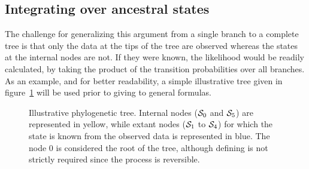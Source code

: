 \subsection{Integrating over ancestral states}
The challenge for generalizing this argument from a single branch to a complete tree is that only the data at the tips of the tree are observed whereas the states at the internal nodes are not.
If they were known, the likelihood would be readily calculated, by taking the product of the transition probabilities over all branches.
As an example, and for better readability, a simple illustrative tree given in figure~\ref{fig:tree} will be used prior to giving to general formulas.
\begin{figure}[H]
    \centering
    \caption[Illustrative phylogenetic tree]{
    Illustrative phylogenetic tree.
    Internal nodes ($\mathcal{S}_0$ and $\mathcal{S}_5$) are represented in yellow, while extant nodes ($\mathcal{S}_1$ to $\mathcal{S}_4$) for which the state is known from the observed data is represented in blue.
    The node $0$ is considered the root of the tree, although defining is not strictly required since the process is reversible.}
    \label{fig:tree}%
\end{figure}

